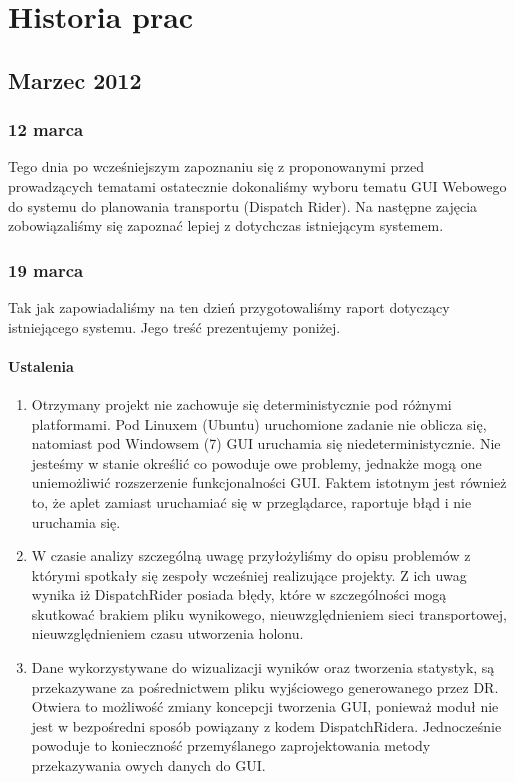 \chapter{Historia prac}
\section{Marzec 2012}

\subsection{12 marca}
Tego dnia po wcześniejszym zapoznaniu się z proponowanymi przed prowadzących tematami ostatecznie
dokonaliśmy wyboru tematu GUI Webowego do systemu do planowania transportu (Dispatch Rider).
Na następne zajęcia zobowiązaliśmy się zapoznać lepiej z dotychczas istniejącym systemem.

\subsection{19 marca}
Tak jak zapowiadaliśmy na ten dzień przygotowaliśmy raport dotyczący istniejącego systemu. Jego treść prezentujemy poniżej.
\subsubsection{Ustalenia}
\begin{enumerate}
\item Otrzymany projekt nie zachowuje się deterministycznie pod różnymi platformami. Pod Linuxem (Ubuntu) uruchomione zadanie nie oblicza się, natomiast pod Windowsem (7) GUI uruchamia się niedeterministycznie. Nie jesteśmy w stanie określić co powoduje owe problemy, jednakże mogą one uniemożliwić rozszerzenie funkcjonalności GUI. Faktem istotnym jest również to, że aplet zamiast uruchamiać się w przeglądarce, raportuje błąd i nie uruchamia się.
\item W czasie analizy szczególną uwagę przyłożyliśmy do opisu problemów z którymi spotkały się zespoły wcześniej realizujące projekty. Z ich uwag wynika iż DispatchRider posiada błędy, które w szczególności mogą skutkować brakiem pliku wynikowego, nieuwzględnieniem sieci transportowej, nieuwzględnieniem czasu utworzenia holonu.
\item Dane wykorzystywane do wizualizacji wyników oraz tworzenia statystyk, są przekazywane za pośrednictwem pliku wyjściowego generowanego przez DR. Otwiera to możliwość zmiany koncepcji tworzenia GUI, ponieważ moduł nie jest w bezpośredni sposób powiązany z kodem DispatchRidera. Jednocześnie powoduje to konieczność przemyślanego zaprojektowania metody przekazywania owych danych do GUI.
\end{enumerate}
